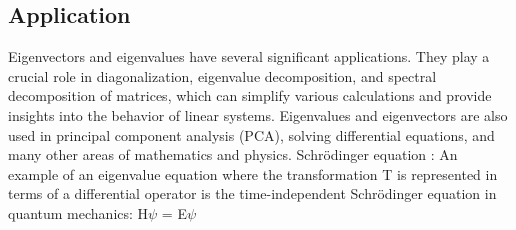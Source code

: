 \documentclass{report}
\begin{document}
\subsection{Application}
Eigenvectors and eigenvalues have several significant applications. They play a crucial role in diagonalization, eigenvalue decomposition, and spectral decomposition of matrices, which can simplify various calculations and provide insights into the behavior of linear systems. Eigenvalues and eigenvectors are also used in principal component analysis (PCA), solving differential equations, and many other areas of mathematics and physics.
Schrödinger equation :
An example of an eigenvalue equation where the transformation T is represented in terms of a differential operator is the time-independent Schrödinger equation in quantum mechanics:
 H$\psi$ = E$\psi$
\end{document}
